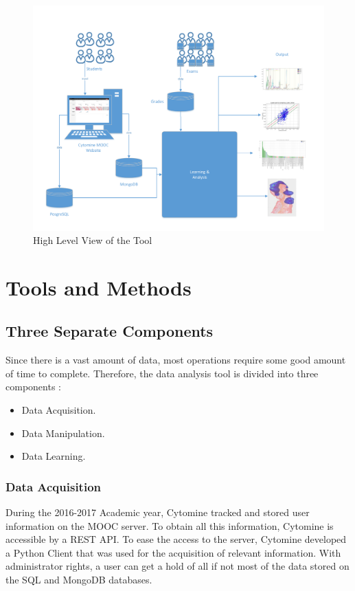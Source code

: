 \documentclass[a4paper,11pt]{report}
\numberwithin{figure}{section} %
\begin{document}
      \begin{figure}[H]
      \centering
      \includegraphics[width=.95\linewidth]{highlevel.pdf}
      \caption{High Level View of the Tool}
      \label{fig:highlevel}
      \end{figure}

\section{Tools and Methods}
	
    \subsection{Three Separate Components}
    	Since there is a vast amount of data, most operations require some good amount of time to complete.
    	Therefore, the data analysis tool is divided into three components :
        \begin{itemize}
        \item[\textbullet] Data Acquisition.
        \item[\textbullet] Data Manipulation.
        \item[\textbullet] Data Learning.
        \end{itemize}

		\subsubsection{Data Acquisition}
        
			During the 2016-2017 Academic year, Cytomine tracked and stored user information on the MOOC server. To obtain all this information, Cytomine is accessible by a REST API. To ease the access to the server, Cytomine developed a Python Client that was used for the acquisition of relevant information. With administrator rights, a user can get a hold of all if not most of the data stored on the SQL and MongoDB databases.
            
\end{document}
